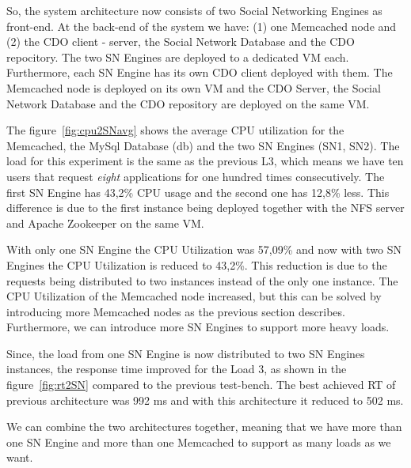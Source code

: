 So, the system architecture now consists of two Social Networking Engines as front-end. At the back-end of the system we have: (1) one Memcached node and (2) the CDO client - server, the Social Network Database and the CDO repocitory. The two SN Engines are deployed to a dedicated VM each. Furthermore, each SN Engine has its own CDO client deployed with them. The Memcached node is deployed on its own VM and the CDO Server, the Social Network Database and the CDO repository are deployed on the same VM.

The figure~\ref{fig:cpu2SNavg} shows the average CPU utilization for the Memcached, the MySql Database (db) and the two SN Engines (SN1, SN2). The load for this experiment is the same as the previous L3, which means we have ten users that request \emph{eight} applications for one hundred times consecutively. The first SN Engine has 43,2\% CPU usage and the second one has 12,8\% less. This difference is due to the first instance being deployed together with the NFS server and Apache Zookeeper on the same VM. 

With only one SN Engine the CPU Utilization was 57,09\% and now with two SN Engines the CPU Utilization is reduced to 43,2\%. This reduction is due to the requests being distributed to two instances instead of the only one instance. The CPU Utilization of the Memcached node increased, but this can be solved by introducing more Memcached nodes as the previous section describes. Furthermore, we can introduce more SN Engines to support more heavy loads.

Since, the load from one SN Engine is now distributed to two SN Engines instances, the response time improved for the Load 3, as shown in the figure~\ref{fig:rt2SN} compared to the previous test-bench. The best achieved RT of previous architecture was 992 ms and with this architecture it reduced to 502 ms.

We can combine the two architectures together, meaning that we have more than one SN Engine and more than one Memcached to support as many loads as we want.

